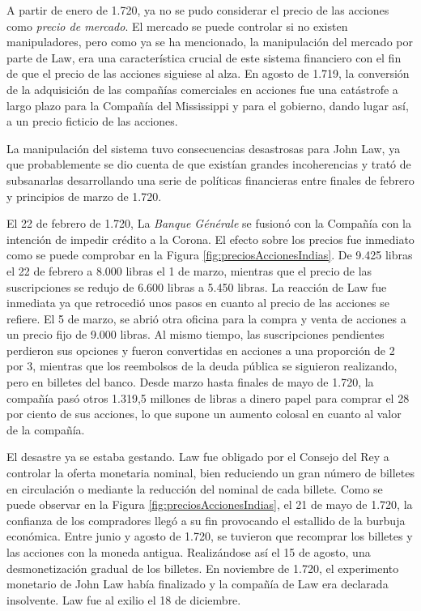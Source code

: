 A partir de enero de 1.720, ya no se pudo considerar el precio de las acciones como \emph{precio de mercado}. El mercado se puede controlar si no existen manipuladores, pero como ya se ha mencionado, la manipulación del mercado por parte de Law, era una característica crucial de este sistema financiero con el fin de que el precio de las acciones siguiese al alza. En agosto de 1.719, la conversión de la adquisición de las compañías comerciales en acciones fue una catástrofe a largo plazo para la Compañía del Mississippi y para el gobierno, dando lugar así, a un precio ficticio de las acciones.

La manipulación del sistema tuvo consecuencias desastrosas para John Law, ya que probablemente se dio cuenta de que existían grandes incoherencias y trató de subsanarlas desarrollando una serie de políticas financieras entre finales de febrero y principios de marzo de 1.720. 

El 22 de febrero de 1.720, La \emph{Banque Générale} se fusionó con la Compañía con la intención de impedir crédito a la Corona. El efecto sobre los precios fue inmediato como se puede comprobar en la Figura \ref{fig:preciosAccionesIndias}. De 9.425 libras el 22 de febrero a 8.000 libras el 1 de marzo, mientras que el precio de las suscripciones se redujo de 6.600 libras a 5.450 libras. La reacción de Law fue inmediata ya que retrocedió unos pasos en cuanto al precio de las acciones se refiere. El 5 de marzo, se abrió otra oficina para la compra y venta de acciones a un precio fijo de 9.000 libras. Al mismo tiempo, las suscripciones pendientes perdieron sus opciones y fueron convertidas en acciones a una proporción de 2 por 3, mientras que los reembolsos de la deuda pública se siguieron realizando, pero en billetes del banco. Desde marzo hasta finales de mayo de 1.720, la compañía pasó otros 1.319,5 millones de libras a dinero papel para comprar el 28 por ciento de sus acciones, lo que supone un aumento colosal en cuanto al valor de la compañía.

El desastre ya se estaba gestando. Law fue obligado por el Consejo del Rey a controlar la oferta monetaria nominal, bien reduciendo un gran número de billetes en circulación o mediante la reducción del nominal de cada billete. Como se puede observar en la Figura \ref{fig:preciosAccionesIndias}, el 21 de mayo de 1.720, la confianza de los compradores llegó a su fin provocando el estallido de la burbuja económica. Entre junio y agosto de 1.720, se tuvieron que recomprar los billetes y las acciones con la moneda antigua. Realizándose así el 15 de agosto, una desmonetización gradual de los billetes. En noviembre de 1.720, el experimento monetario de John Law había finalizado y la compañía de Law era declarada insolvente. Law fue al exilio el 18 de diciembre.

